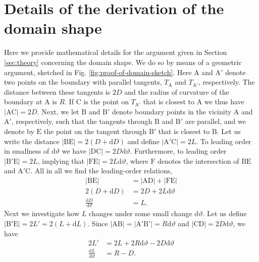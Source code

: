 \section{Details of the derivation of the domain shape} \label{app:diff-for-domain}
Here we provide mathematical details for the argument given in Section \ref{sec:theory} concerning the domain shape. 
We do so by means of a geometric argument, sketched in Fig. \ref{fig:proof-of-domain-sketch}. Here $\mathrm{A}$ and $\mathrm{A}'$ denote two points on the boundary with parallel tangents, $T_{\mathrm{A}}$ and $T_{\mathrm{{A}'}}$, respectively. The distance between these tangents is $2D$ and the radius of curvature of the boundary at $\mathrm{A}$ is $R$. If $\mathrm{C}$ is the point on $T_{\mathrm{A}'}$ that is closest to $\mathrm{A}$ we thus have $|\mathrm{AC}|=2D$. Next, we let $\mathrm{B}$ and $\mathrm{B}'$ denote boundary points in the vicinity $\mathrm{A}$ and $\mathrm{A}'$, respectively, such that the tangents through $\mathrm{B}$ and $\mathrm{B}'$ are parallel, and we denote by $\mathrm{E}$ the point on the tangent through $\mathrm{B}'$ that is closest to $\mathrm{B}$. Let us write the distance $|\mathrm{BE}|=2(D+\mathrm{d}D)$ and define $|\mathrm{A}'\mathrm{C}|=2L$. To leading order in smallness of $\mathrm{d} \vartheta$ we have $|\mathrm{DC}|=2D \mathrm{d} \vartheta$. Furthermore, to leading order $|\mathrm{B}'\mathrm{E}|=2L$, implying that $|\mathrm{FE}|=2L\mathrm{d}\vartheta$, where $\mathrm{F}$ denotes the intersection of $\mathrm{BE}$ and $\mathrm{A}'\mathrm{C}$. All in all we find the leading-order relations,
\begin{equation*}
\begin{aligned}
    |\mathrm{BE}|&=|\mathrm{AD}|+|\mathrm{FE}| \\
    2(D+ \mathrm{d}D) &= 2D + 2L \mathrm{d} \vartheta \\
    \frac{\mathrm{d}D}{\mathrm{d}\vartheta} &= L.
\end{aligned}
\end{equation*}
Next we investigate how $L$ changes under some small change $\mathrm{d}\vartheta$. Let us define $|\mathrm{B}'\mathrm{E}|=2L' = 2(L+ \mathrm{d}L)$. Since $|\mathrm{AB}|=|\mathrm{A}'\mathrm{B}'|=R\mathrm{d}\vartheta$ and $|\mathrm{CD}|=2D\mathrm{d}\vartheta$, we have
\begin{equation*}
\begin{aligned}
    2L'&= 2L + 2 R \mathrm{d} \vartheta - 2D\mathrm{d}\vartheta \\
    \frac{\mathrm{d}L}{\mathrm{d}\vartheta} &= R - D.
\end{aligned}
\end{equation*}
